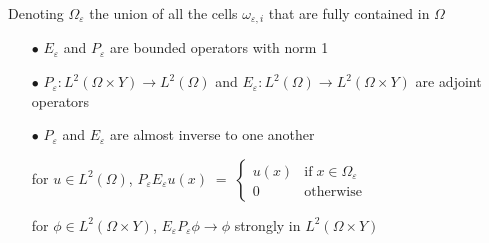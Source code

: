 \documentclass[mathserif,9pt]{beamer}
\def\e{{\varepsilon}}
\begin{document}
\begin{frame}
\small{

Denoting $\Omega_\e$ the union of all the cells $\omega_{\e,i}$ that are
fully contained in $\Omega$
\bigskip


\begin{itemize}
\item[$\bullet$]
$E_\e$ and $P_\e$ are bounded operators with norm 1
\medskip

\item[$\bullet$] $P_\e : L^2(\Omega \times Y) \rightarrow L^2(\Omega)$ 
and $E_\e : L^2(\Omega) \rightarrow L^2(\Omega \times Y)$
are \textcolor{b_bruz}{adjoint operators}
\medskip

\item[$\bullet$] $P_\e$ and $E_\e$ are \textcolor{b_bruz}{almost inverse} 
to one another

for $u \in L^2(\Omega)$, \quad
\textcolor{ox}{
$P_\e E_\e u(x) \;=\; 
\left\{ \begin{array}{cl}
u(x) & \textrm{if}\; x \in \Omega_\e
\\
0 & \textrm{otherwise}
\end{array} \right.$}
\medskip

for $\phi \in L^2(\Omega \times Y)$, 
\textcolor{ox}{ \quad $E_\e P_\e \phi \rightarrow \phi$
strongly in $L^2(\Omega \times Y)$}
\end{itemize}


}
\end{frame}
\end{document}
